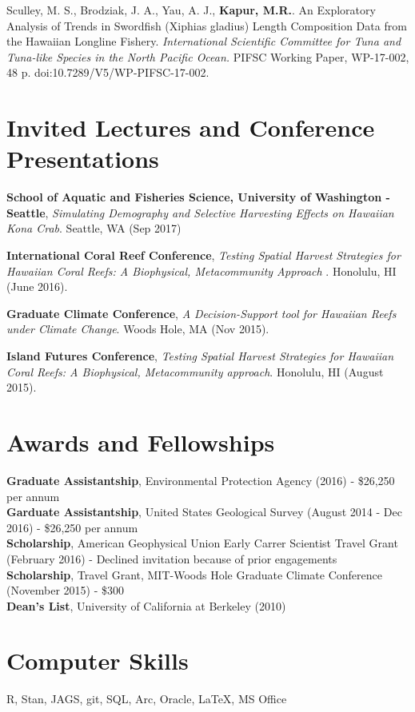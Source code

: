 \documentclass[10pt, letterpaper]{article}
\begin{document}
\hangindent=0.5cm \noindent  Sculley, M. S., Brodziak, J. A., Yau, A. J., \textbf{Kapur, M.R.}. An Exploratory Analysis of Trends in Swordfish (Xiphias gladius) Length Composition Data from the Hawaiian Longline Fishery. \textit{International Scientific Committee for Tuna and Tuna-like Species in the North Pacific Ocean.} PIFSC Working Paper, WP-17-002, 48 p. doi:10.7289/V5/WP-PIFSC-17-002. \\

\section*{Invited Lectures and Conference Presentations}

\noindent \textbf{School of Aquatic and Fisheries Science, University of Washington - Seattle}, \textit{Simulating Demography and Selective Harvesting Effects on Hawaiian Kona Crab}. Seattle, WA (Sep 2017)

\noindent \textbf{International Coral Reef Conference}, \textit{Testing Spatial Harvest Strategies for Hawaiian Coral Reefs: A Biophysical, Metacommunity Approach }. Honolulu, HI (June 2016).

\noindent \textbf{Graduate Climate Conference}, \textit{A Decision-Support tool for Hawaiian Reefs under Climate Change}. Woods Hole, MA (Nov 2015).

\noindent \textbf{Island Futures Conference}, \textit{Testing Spatial Harvest Strategies for Hawaiian Coral Reefs: A Biophysical, Metacommunity approach}. Honolulu, HI (August 2015).

\section*{Awards and Fellowships}
\textbf{Graduate Assistantship}, Environmental Protection Agency (2016) - \$26,250 per annum \\
\textbf{Garduate Assistantship}, United States Geological Survey (August 2014 - Dec 2016) - \$26,250 per annum \\
\textbf{Scholarship}, American Geophysical Union Early Carrer Scientist Travel Grant (February 2016) - Declined invitation because of prior engagements \\
\textbf{Scholarship}, Travel Grant, MIT-Woods Hole Graduate Climate Conference (November 2015) - \$300 \\
\textbf{Dean's List}, University of California at Berkeley (2010) \\

\section*{Computer Skills}
 R, Stan, JAGS, git, SQL, Arc, Oracle, \LaTeX, MS Office
\end{document}
